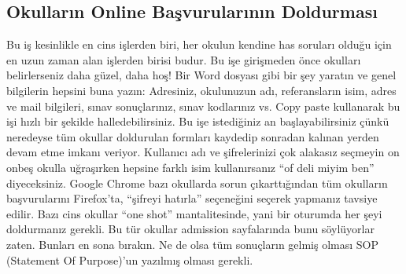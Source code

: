 \documentclass[12pt]{article}
\begin{document}
\subsection{Okulların Online Başvurularının Doldurması}
Bu iş kesinlikle en cins işlerden biri, her okulun kendine has soruları olduğu için en uzun zaman alan işlerden birisi budur. Bu işe girişmeden önce okulları belirlerseniz daha güzel, daha hoş! Bir Word dosyası gibi bir şey yaratın ve genel bilgilerin hepsini buna yazın: Adresiniz, okulunuzun adı, referansların isim, adres ve mail bilgileri, sınav sonuçlarınız, sınav kodlarınız vs. Copy paste kullanarak bu işi hızlı bir şekilde halledebilirsiniz. Bu işe istediğiniz an başlayabilirsiniz çünkü neredeyse tüm okullar doldurulan formları kaydedip sonradan kalınan yerden devam etme imkanı veriyor. Kullanıcı adı ve şifrelerinizi çok alakasız seçmeyin on onbeş okulla uğraşırken hepsine farklı isim kullanırsanız “of deli miyim ben” diyeceksiniz. Google Chrome bazı okullarda sorun çıkarttığından tüm okulların başvurularını Firefox’ta, “şifreyi hatırla” seçeneğini seçerek yapmanız tavsiye edilir. Bazı cins okullar “one shot” mantalitesinde, yani bir oturumda her şeyi doldurmanız gerekli. Bu tür okullar admission sayfalarında bunu söylüyorlar zaten. Bunları en sona bırakın. Ne de olsa tüm sonuçların gelmiş olması SOP (Statement Of Purpose)’un yazılmış olması gerekli.
\end{document}
